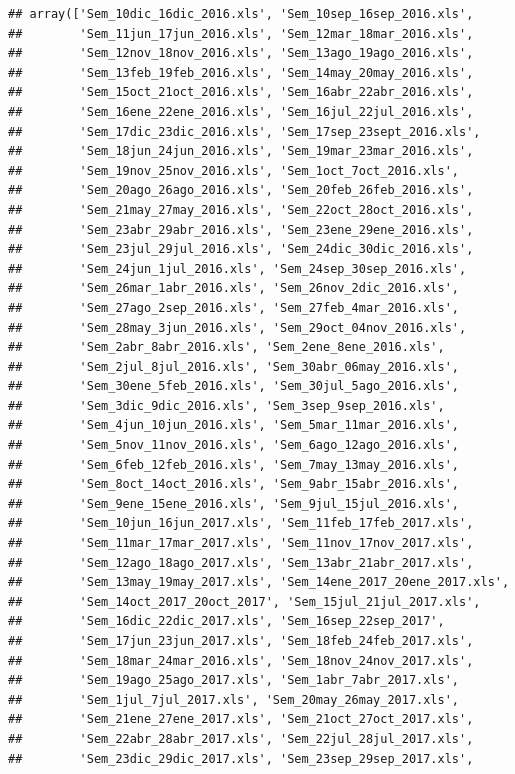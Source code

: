 \documentclass[
]{book}
\begin{document}
\begin{verbatim}
## array(['Sem_10dic_16dic_2016.xls', 'Sem_10sep_16sep_2016.xls',
##        'Sem_11jun_17jun_2016.xls', 'Sem_12mar_18mar_2016.xls',
##        'Sem_12nov_18nov_2016.xls', 'Sem_13ago_19ago_2016.xls',
##        'Sem_13feb_19feb_2016.xls', 'Sem_14may_20may_2016.xls',
##        'Sem_15oct_21oct_2016.xls', 'Sem_16abr_22abr_2016.xls',
##        'Sem_16ene_22ene_2016.xls', 'Sem_16jul_22jul_2016.xls',
##        'Sem_17dic_23dic_2016.xls', 'Sem_17sep_23sept_2016.xls',
##        'Sem_18jun_24jun_2016.xls', 'Sem_19mar_23mar_2016.xls',
##        'Sem_19nov_25nov_2016.xls', 'Sem_1oct_7oct_2016.xls',
##        'Sem_20ago_26ago_2016.xls', 'Sem_20feb_26feb_2016.xls',
##        'Sem_21may_27may_2016.xls', 'Sem_22oct_28oct_2016.xls',
##        'Sem_23abr_29abr_2016.xls', 'Sem_23ene_29ene_2016.xls',
##        'Sem_23jul_29jul_2016.xls', 'Sem_24dic_30dic_2016.xls',
##        'Sem_24jun_1jul_2016.xls', 'Sem_24sep_30sep_2016.xls',
##        'Sem_26mar_1abr_2016.xls', 'Sem_26nov_2dic_2016.xls',
##        'Sem_27ago_2sep_2016.xls', 'Sem_27feb_4mar_2016.xls',
##        'Sem_28may_3jun_2016.xls', 'Sem_29oct_04nov_2016.xls',
##        'Sem_2abr_8abr_2016.xls', 'Sem_2ene_8ene_2016.xls',
##        'Sem_2jul_8jul_2016.xls', 'Sem_30abr_06may_2016.xls',
##        'Sem_30ene_5feb_2016.xls', 'Sem_30jul_5ago_2016.xls',
##        'Sem_3dic_9dic_2016.xls', 'Sem_3sep_9sep_2016.xls',
##        'Sem_4jun_10jun_2016.xls', 'Sem_5mar_11mar_2016.xls',
##        'Sem_5nov_11nov_2016.xls', 'Sem_6ago_12ago_2016.xls',
##        'Sem_6feb_12feb_2016.xls', 'Sem_7may_13may_2016.xls',
##        'Sem_8oct_14oct_2016.xls', 'Sem_9abr_15abr_2016.xls',
##        'Sem_9ene_15ene_2016.xls', 'Sem_9jul_15jul_2016.xls',
##        'Sem_10jun_16jun_2017.xls', 'Sem_11feb_17feb_2017.xls',
##        'Sem_11mar_17mar_2017.xls', 'Sem_11nov_17nov_2017.xls',
##        'Sem_12ago_18ago_2017.xls', 'Sem_13abr_21abr_2017.xls',
##        'Sem_13may_19may_2017.xls', 'Sem_14ene_2017_20ene_2017.xls',
##        'Sem_14oct_2017_20oct_2017', 'Sem_15jul_21jul_2017.xls',
##        'Sem_16dic_22dic_2017.xls', 'Sem_16sep_22sep_2017',
##        'Sem_17jun_23jun_2017.xls', 'Sem_18feb_24feb_2017.xls',
##        'Sem_18mar_24mar_2016.xls', 'Sem_18nov_24nov_2017.xls',
##        'Sem_19ago_25ago_2017.xls', 'Sem_1abr_7abr_2017.xls',
##        'Sem_1jul_7jul_2017.xls', 'Sem_20may_26may_2017.xls',
##        'Sem_21ene_27ene_2017.xls', 'Sem_21oct_27oct_2017.xls',
##        'Sem_22abr_28abr_2017.xls', 'Sem_22jul_28jul_2017.xls',
##        'Sem_23dic_29dic_2017.xls', 'Sem_23sep_29sep_2017.xls',

\end{verbatim}
\end{document}

